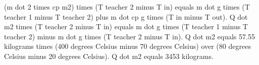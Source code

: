 (m dot 2 times cp m2) times (T teacher 2 minus T in) equals m dot g times (T teacher 1 minus T teacher 2) plus m dot cp g times (T in minus T out).  
Q dot m2 times (T teacher 2 minus T in) equals m dot g times (T teacher 1 minus T teacher 2) minus m dot g times (T teacher 2 minus T in).  
Q dot m2 equals 57.55 kilograms times (400 degrees Celsius minus 70 degrees Celsius) over (80 degrees Celsius minus 20 degrees Celsius).  
Q dot m2 equals 3453 kilograms.